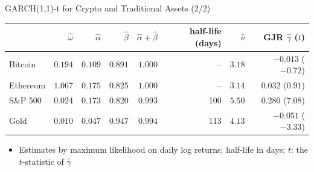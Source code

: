 \begin{frame}{GARCH(1,1)-t for Crypto and Traditional Assets (2/2)}
\itemsize{\footnotesize}
\begin{center}
\scriptsize
\begin{tabular}{lrrrrrrr}
\toprule
& $\hat\omega$ & $\hat\alpha$ & $\hat\beta$ & $\hat\alpha + \hat\beta$ & half-life (days) & $\hat\nu$ & GJR $\hat\gamma$ ($t$) \\
\midrule
Bitcoin & $0.194$ & $0.109$ & $0.891$ & $1.000$ & -- & $3.18$ & $-0.013$ ($-0.72$) \\
Ethereum & $1.067$ & $0.175$ & $0.825$ & $1.000$ & -- & $3.14$ & $0.032$ ($0.91$) \\
S\&P 500 & $0.024$ & $0.173$ & $0.820$ & $0.993$ & 100 & $5.50$ & $0.280$ ($7.08$) \\
Gold & $0.010$ & $0.047$ & $0.947$ & $0.994$ & 113 & $4.13$ & $-0.051$ ($-3.33$) \\
\bottomrule
\end{tabular}
\end{center}
\begin{itemize}
    \item Estimates by maximum likelihood on daily log returns; half-life in days; $t$: the $t$-statistic of $\hat\gamma$
\end{itemize}
\end{frame}

